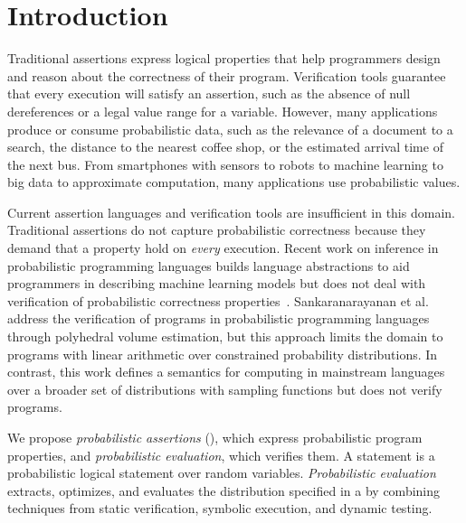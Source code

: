 \section{Introduction}
Traditional assertions express logical properties that help programmers design and
reason about the correctness of their program. Verification tools
guarantee that every execution will satisfy an assertion, such as the
absence of null dereferences or a legal value range for a variable.
However, many applications produce or consume probabilistic data, such as the
relevance of a document to a search, the distance to the nearest
coffee shop,
or the estimated arrival time of the next bus. From smartphones with
sensors to robots to machine learning to big data to approximate
computation, many applications use probabilistic
values.

Current assertion languages and verification tools are insufficient in
this domain.  Traditional assertions do not capture probabilistic
correctness because they demand that a property hold on \emph{every}
execution.  Recent work on inference in probabilistic programming
languages builds language abstractions to aid programmers in describing
machine learning models but
does not deal with verification of probabilistic correctness
properties~\cite{infernet, church, pmonad, PPT:05}. Sankaranarayanan et al.~\cite{sriram-pldi} address the
verification of programs in probabilistic programming
languages through polyhedral volume estimation,
but this approach limits the domain to programs with linear arithmetic
over constrained probability distributions.
In contrast, this work
defines a semantics for computing in mainstream languages over a broader set of distributions
with sampling functions
but does not verify programs.

We propose \emph{probabilistic assertions}
(\passerts), which express probabilistic program properties, and
\emph{probabilistic evaluation}, which verifies them.  A \passert
statement is a probabilistic logical statement over random
variables. \emph{Probabilistic evaluation} extracts, optimizes, and
evaluates the distribution specified in a \passert by
combining techniques from static verification,
symbolic execution, and dynamic testing.

